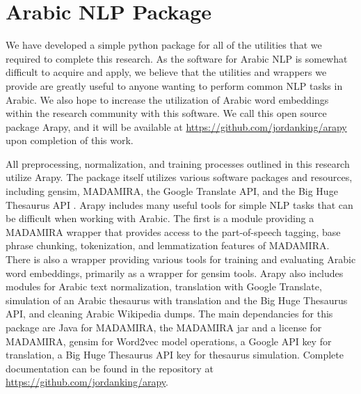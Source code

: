 \section{Arabic NLP Package}
\label{sec:arapy}

We have developed a simple python package for all of the utilities that we required to complete this research. As the software for Arabic NLP is somewhat difficult to acquire and apply, we believe that the utilities and wrappers we provide are greatly useful to anyone wanting to perform common NLP tasks in Arabic. We also hope to increase the utilization of Arabic word embeddings within the research community with this software. We call this open source package Arapy, and it will be available at \url{https://github.com/jordanking/arapy} upon completion of this work. 

All preprocessing, normalization, and training processes outlined in this research utilize Arapy. The package itself utilizes various software packages and resources, including gensim, MADAMIRA, the Google Translate API, and the Big Huge Thesaurus API \cite{rehurek_lrec,pasha:2014,google:online,bhl:online}. Arapy includes many useful tools for simple NLP tasks that can be difficult when working with Arabic. The first is a module providing a MADAMIRA wrapper that provides access to the part-of-speech tagging, base phrase chunking, tokenization, and lemmatization features of MADAMIRA. There is also a wrapper providing various tools for training and evaluating Arabic word embeddings, primarily as a wrapper for gensim tools. Arapy also includes modules for Arabic text normalization, translation with Google Translate, simulation of an Arabic thesaurus with translation and the Big Huge Thesaurus API, and cleaning Arabic Wikipedia dumps. The main dependancies for this package are Java for MADAMIRA, the MADAMIRA jar and a license for MADAMIRA, gensim for Word2vec model operations, a Google API key for translation, a Big Huge Thesaurus API key for thesaurus simulation. Complete documentation can be found in the repository at \url{https://github.com/jordanking/arapy}.
